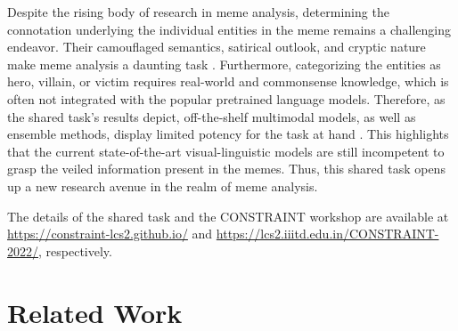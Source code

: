 \documentclass[11pt]{article}
\begin{document}
Despite the rising body of research in meme analysis, determining the connotation underlying the individual entities in the meme remains a challenging endeavor. Their camouflaged semantics, satirical outlook, and cryptic nature make meme analysis a daunting task \cite{sabat2019hate}. Furthermore, categorizing the entities as hero, villain, or victim requires real-world and commonsense knowledge, which is often not integrated with the popular pretrained language models. Therefore, as the shared task's results depict, off-the-shelf multimodal models, as well as ensemble methods, display limited potency for the task at hand \cite{kiela2020hateful}. This highlights that the current state-of-the-art visual-linguistic models are still incompetent to grasp the veiled information present in the memes. Thus, this shared task opens up a new research avenue in the realm of meme analysis. 

The details of the shared task and the CONSTRAINT workshop are available at \url{https://constraint-lcs2.github.io/} and \url{https://lcs2.iiitd.edu.in/CONSTRAINT-2022/}, respectively.





\section{Related Work}


\end{document}
